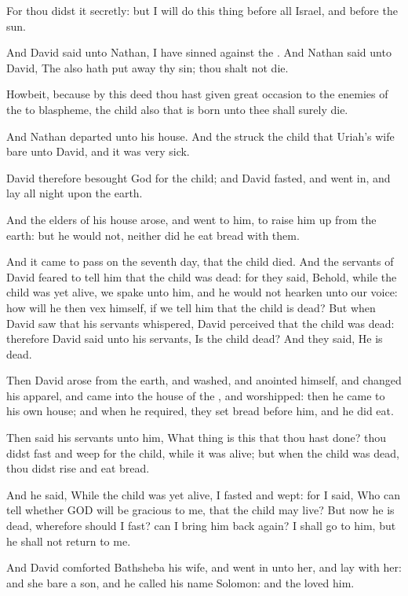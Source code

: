 \verse For thou didst it secretly: but I will do this thing before all Israel, and before the sun.

\verse And David said unto Nathan, I have sinned against the \LORD. And Nathan said unto David, The \LORD also hath put away thy sin; thou shalt not die.

\verse Howbeit, because by this deed thou hast given great occasion to the enemies of the \LORD to blaspheme, the child also that is born unto thee shall surely die.

\verse And Nathan departed unto his house. And the \LORD struck the child that Uriah's wife bare unto David, and it was very sick.

\verse David therefore besought God for the child; and David fasted, and went in, and lay all night upon the earth.

\verse And the elders of his house arose, and went to him, to raise him up from the earth: but he would not, neither did he eat bread with them.

\verse And it came to pass on the seventh day, that the child died. And the servants of David feared to tell him that the child was dead: for they said, Behold, while the child was yet alive, we spake unto him, and he would not hearken unto our voice: how will he then vex himself, if we tell him that the child is dead?  \verse But when David saw that his servants whispered, David perceived that the child was dead: therefore David said unto his servants, Is the child dead? And they said, He is dead.

\verse Then David arose from the earth, and washed, and anointed himself, and changed his apparel, and came into the house of the \LORD, and worshipped: then he came to his own house; and when he required, they set bread before him, and he did eat.

\verse Then said his servants unto him, What thing is this that thou hast done? thou didst fast and weep for the child, while it was alive; but when the child was dead, thou didst rise and eat bread.

\verse And he said, While the child was yet alive, I fasted and wept: for I said, Who can tell whether GOD will be gracious to me, that the child may live?  \verse But now he is dead, wherefore should I fast?  can I bring him back again? I shall go to him, but he shall not return to me.

\verse And David comforted Bathsheba his wife, and went in unto her, and lay with her: and she bare a son, and he called his name Solomon: and the \LORD loved him.

